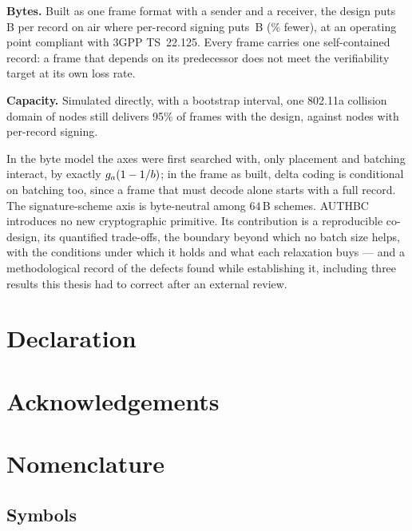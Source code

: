 \textbf{Bytes.} Built as one frame format with a sender and a receiver, the design puts
\bprLeanDesign\,B per record on air where per-record signing puts \bprLeanBase\,B
(\saveLean\% fewer), at an operating point compliant with 3GPP TS~22.125. Every frame carries one
self-contained record: a frame that depends on its predecessor does not meet the verifiability
target at its own loss rate.

\textbf{Capacity.} Simulated directly, with a bootstrap interval, one 802.11a collision domain
of \nmaxLeanDesign{} nodes still delivers 95\% of frames with the design, against
\nmaxLeanBase{} nodes with per-record signing.

In the byte model the axes were first searched with, only placement and batching interact, by
exactly $g_a(1-1/b)$; in the frame as built, delta coding is conditional on batching too, since a
frame that must decode alone starts with a full record. The signature-scheme axis is byte-neutral
among $64$\,B schemes. AUTHBC
introduces no new cryptographic primitive. Its contribution is a reproducible co-design, its
quantified trade-offs, the boundary beyond which no batch size helps, with the conditions under
which it holds and what each relaxation buys --- and a
methodological record of the defects found while establishing it, including three results this
thesis had to correct after an external review.

\chapter*{Declaration}


\chapter*{Acknowledgements}


\chapter*{Nomenclature}

\section*{Symbols}

